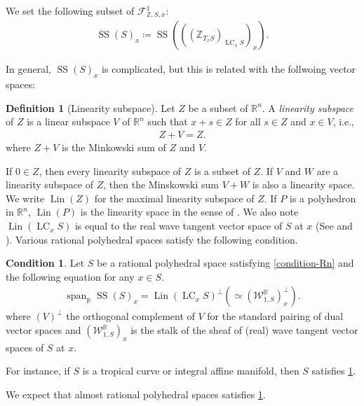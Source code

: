\documentclass[a4paper,dvipdfmx,reqno,12pt]{amsart}
\theoremstyle{definition}
\newtheorem{definition}[theorem]{Definition}
\newtheorem{condition}[theorem]{Condition}
\newcommand{\deq}{\coloneqq}
\newcommand{\opn}[1]{\operatorname{#1}}
\numberwithin{equation}{section}
\begin{document}
We set the following subset of $\mathcal{F}_{\mathbb{Z},S,x}^{1}$:
\begin{align}
\opn{SS}(S)_x\deq 
\opn{SS}(((\mathbb{Z}_{T_x S})_{\opn{LC}_x S})_x).
\end{align}

In general, $\opn{SS}(S)_x$  
is complicated, but this is related with the 
follwoing vector 
spaces:

\begin{definition}[{Linearity subspace}]
Let $Z$ be a subset of
$\mathbb{R}^{n}$. A \emph{linearity subspace} of $Z$ is 
a linear subspace $V$ of
$\mathbb{R}^{n}$ such that $x+s\in Z$ for all 
$s\in Z$ and $x\in V$, i.e.,
\begin{align}
Z+V=Z.
\end{align}
where $Z+V$ is the Minkowski sum of $Z$ and $V$.
\end{definition}
If $0\in Z$, then 
every linearity subspace of $Z$ is a subset of $Z$.
If $V$ and $W$ are a linearity subspace of $Z$, 
then the Minskowski sum $V+W$ is 
also a linearity space.
We write $\opn{Lin}(Z)$ for the maximal linearity 
subspace of $Z$. If $P$ is a polyhedron in 
$\mathbb{R}^{n}$, $\opn{Lin}(P)$ is the linearity space
in the sense of \cite[p.60]{MR3287221}.
We also note $\opn{Lin}(\opn{LC}_x S)$ is equal to 
the real wave tangent vector space of $S$ at 
$x$ (See \cite[1.3]{mikhalkinTropicalEigenwaveIntermediate2014a} and 
\cite[Definition 2.16, Remark 2.21]{yamamotoTropicalContractionsIntegral2021}).
Various rational polyhedral spaces satisfy the 
following condition.
\begin{condition}
\label{condition-good-linearity-space}
Let $S$ be a rational polyhedral space 
satisfying \cref{condition-Rn} and the following
equation for any $x\in S$. 
\begin{align}
\opn{span}_{{\mathbb{R}}}\opn{SS}(S)_x=
\opn{Lin}(\opn{LC}_xS)^{\bot}(\simeq 
(\mathcal{W}_{1,S}^{\mathbb{R}})_{x}^{\bot}).
\end{align}
where $(V)^{\bot}$ the orthogonal complement of 
$V$ for the standard pairing of dual vector spaces
and $(\mathcal{W}_{1,S}^{\mathbb{R}})_{x}$ is 
the stalk of the sheaf of (real) wave tangent 
vector spaces of $S$ at $x$. 

\end{condition}

For instance, if $S$ is a tropical curve 
or integral affine manifold, 
then $S$ satisfies \cref{condition-good-linearity-space}.

We expect that almost rational polyhedral spaces 
satisfies \cref{condition-good-linearity-space}.
\end{document}
